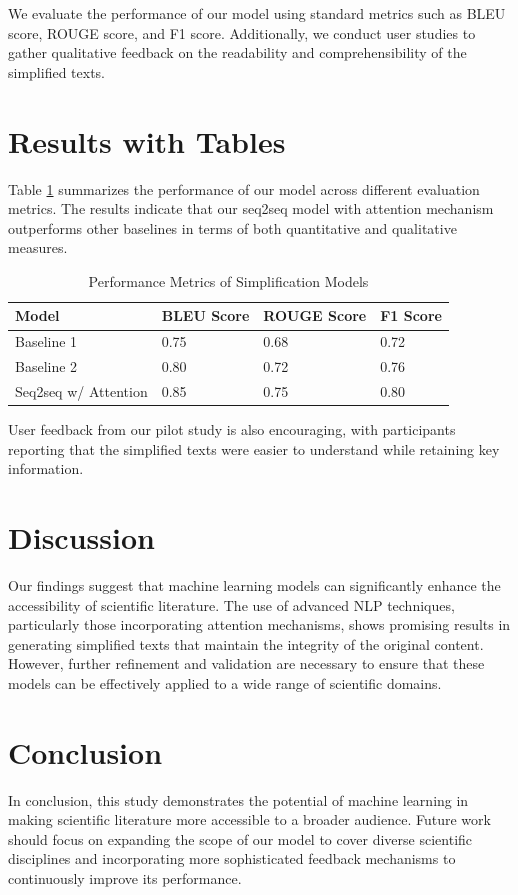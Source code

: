 \documentclass{article}
\begin{document}
We evaluate the performance of our model using standard metrics such as BLEU score, ROUGE score, and F1 score. Additionally, we conduct user studies to gather qualitative feedback on the readability and comprehensibility of the simplified texts. 

\section{Results with Tables}
Table \ref{tab:results} summarizes the performance of our model across different evaluation metrics. The results indicate that our seq2seq model with attention mechanism outperforms other baselines in terms of both quantitative and qualitative measures.

\begin{table}[ht]
    \centering
    \caption{Performance Metrics of Simplification Models}
    \label{tab:results}
    \begin{tabular}{@{}llll@{}}
    \toprule
    Model & BLEU Score & ROUGE Score & F1 Score \\
    \midrule
    Baseline 1 & 0.75 & 0.68 & 0.72 \\
    Baseline 2 & 0.80 & 0.72 & 0.76 \\
    Seq2seq w/ Attention & 0.85 & 0.75 & 0.80 \\
    \bottomrule
    \end{tabular}
\end{table}

User feedback from our pilot study is also encouraging, with participants reporting that the simplified texts were easier to understand while retaining key information.

\section{Discussion}
Our findings suggest that machine learning models can significantly enhance the accessibility of scientific literature. The use of advanced NLP techniques, particularly those incorporating attention mechanisms, shows promising results in generating simplified texts that maintain the integrity of the original content. However, further refinement and validation are necessary to ensure that these models can be effectively applied to a wide range of scientific domains.

\section{Conclusion}
In conclusion, this study demonstrates the potential of machine learning in making scientific literature more accessible to a broader audience. Future work should focus on expanding the scope of our model to cover diverse scientific disciplines and incorporating more sophisticated feedback mechanisms to continuously improve its performance.
\end{document}
